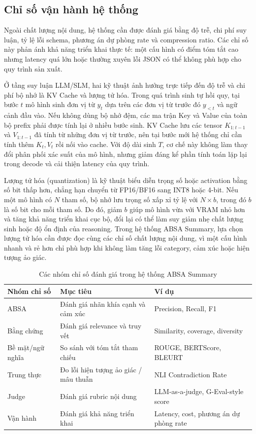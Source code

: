 \subsection{Chỉ số vận hành hệ thống}
\label{subsec:dev-chap2-operational-metrics}

Ngoài chất lượng nội dung, hệ thống cần được đánh giá bằng độ trễ, chi phí suy luận, tỷ lệ lỗi schema, phương án dự phòng rate và compression ratio. Các chỉ số này phản ánh khả năng triển khai thực tế: một cấu hình có điểm tóm tắt cao nhưng latency quá lớn hoặc thường xuyên lỗi JSON có thể không phù hợp cho quy trình sản xuất.

Ở tầng suy luận LLM/SLM, hai kỹ thuật ảnh hưởng trực tiếp đến độ trễ và chi phí bộ nhớ là KV Cache và lượng tử hóa. Trong quá trình sinh tự hồi quy, tại bước $t$ mô hình sinh đơn vị từ $y_t$ dựa trên các đơn vị từ trước đó $y_{<t}$ và ngữ cảnh đầu vào. Nếu không dùng bộ nhớ đệm, các ma trận Key và Value của toàn bộ prefix phải được tính lại ở nhiều bước sinh. KV Cache lưu các tensor $K_{1:t-1}$ và $V_{1:t-1}$ đã tính từ những đơn vị từ trước, nên tại bước mới hệ thống chỉ cần tính thêm $K_t,V_t$ rồi nối vào cache. Với độ dài sinh $T$, cơ chế này không làm thay đổi phân phối xác suất của mô hình, nhưng giảm đáng kể phần tính toán lặp lại trong decode và cải thiện latency của quy trình.

Lượng tử hóa (quantization) là kỹ thuật biểu diễn trọng số hoặc activation bằng số bit thấp hơn, chẳng hạn chuyển từ FP16/BF16 sang INT8 hoặc 4-bit. Nếu một mô hình có $N$ tham số, bộ nhớ lưu trọng số xấp xỉ tỷ lệ với $N\times b$, trong đó $b$ là số bit cho mỗi tham số. Do đó, giảm $b$ giúp mô hình vừa với VRAM nhỏ hơn và tăng khả năng triển khai cục bộ, đổi lại có thể làm suy giảm nhẹ chất lượng sinh hoặc độ ổn định của reasoning. Trong hệ thống ABSA Summary, lựa chọn lượng tử hóa cần được đọc cùng các chỉ số chất lượng nội dung, vì một cấu hình nhanh và rẻ hơn chỉ phù hợp khi không làm tăng lỗi category, cảm xúc hoặc hiện tượng ảo giác.

\begin{table}[htbp]
\centering
\caption{Các nhóm chỉ số đánh giá trong hệ thống ABSA Summary}
\label{tab:dev-chap2-eval-metrics}
\begin{tabular}{p{}p{}p{}}
\toprule
\textbf{Nhóm chỉ số} & \textbf{Mục tiêu} & \textbf{Ví dụ} \\
\midrule
ABSA & Đánh giá nhãn khía cạnh và cảm xúc & Precision, Recall, F1 \\
Bằng chứng & Đánh giá relevance và truy vết & Similarity, coverage, diversity \\
Bề mặt/ngữ nghĩa & So sánh với tóm tắt tham chiếu & ROUGE, BERTScore, BLEURT \\
Trung thực & Đo lỗi hiện tượng ảo giác / mâu thuẫn & NLI Contradiction Rate \\
Judge & Đánh giá rubric nội dung & LLM-as-a-judge, G-Eval-style score \\
Vận hành & Đánh giá khả năng triển khai & Latency, cost, phương án dự phòng rate \\
\bottomrule
\end{tabular}
\end{table}

